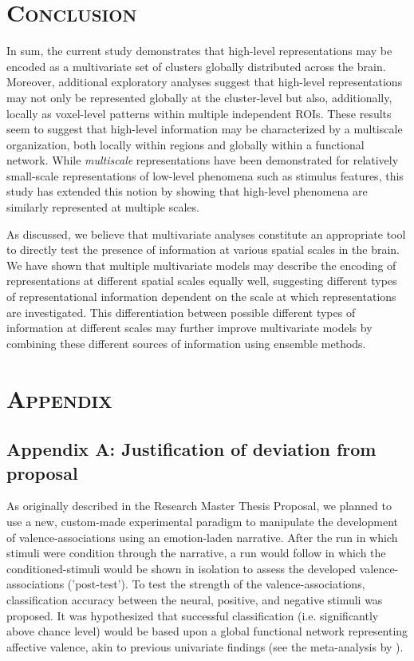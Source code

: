 \documentclass[jou,12pt,a4paper]{apa6}
\begin{document}
\section{\Large \textsc{Conclusion}}
\noindent In sum, the current study demonstrates that high-level representations may be encoded as a multivariate set of clusters globally distributed across the brain. Moreover, additional exploratory analyses suggest that high-level representations may not only be represented globally at the cluster-level but also, additionally, locally as voxel-level patterns within multiple independent ROIs. These results seem to suggest that high-level information may be characterized by a multiscale organization, both locally within regions and globally within a functional network. While \emph{multiscale} representations have been demonstrated for relatively small-scale representations of low-level phenomena such as stimulus features, this study has extended this notion by showing that high-level phenomena are similarly represented at multiple scales.

As discussed, we believe that multivariate analyses constitute an appropriate tool to directly test the presence of information at various spatial scales in the brain. We have shown that multiple multivariate models may describe the encoding of representations at different spatial scales equally well, suggesting different types of representational information dependent on the scale at which representations are investigated. This differentiation between possible different types of information at different scales may further improve multivariate models by combining these different sources of information using ensemble methods.




\newpage
\onecolumn
\vspace*{1px}
\section{\Huge \textnormal{\textsc{Appendix}}}
\vspace{25px}
\subsection{\LARGE \textnormal{Appendix A: Justification of deviation from proposal}}
\vspace{10px}

\noindent As originally described in the Research Master Thesis Proposal, we planned to use a new, custom-made experimental paradigm to manipulate the development of valence-associations using an emotion-laden narrative. After the run in which stimuli were condition through the narrative, a run would follow in which the conditioned-stimuli would be shown in isolation to assess the developed valence-associations ('post-test'). To test the strength of the valence-associations, classification accuracy between the neural, positive, and negative stimuli was proposed. It was hypothesized that successful classification (i.e. significantly above chance level) would be based upon a global functional network representing affective valence, akin to previous univariate findings (see the meta-analysis by ). 
\end{document}
